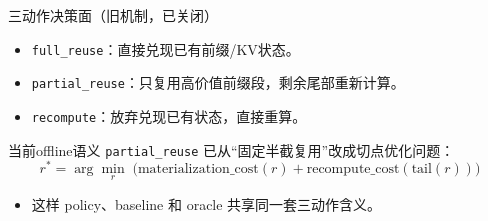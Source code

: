 \documentclass[aspectratio=169,UTF8,11pt]{ctexbeamer}
\begin{document}
\begin{frame}{三动作决策面（旧机制，已关闭）}
  \begin{itemize}
    \item \texttt{full\_reuse}：直接兑现已有前缀/KV状态。
    \item \texttt{partial\_reuse}：只复用高价值前缀段，剩余尾部重新计算。
    \item \texttt{recompute}：放弃兑现已有状态，直接重算。
  \end{itemize}

  \vspace{0.5em}
  \begin{block}{当前offline语义}
    \texttt{partial\_reuse} 已从“固定半截复用”改成\alert{切点优化问题}：
    \[
      r^* = \arg\min_r\; \bigl(\mathrm{materialization\_cost}(r) + \mathrm{recompute\_cost}(\mathrm{tail}(r))\bigr)
    \]
  \end{block}

  \begin{itemize}
    \item 这样 policy、baseline 和 oracle 共享同一套三动作含义。
  \end{itemize}
\end{frame}
\end{document}
